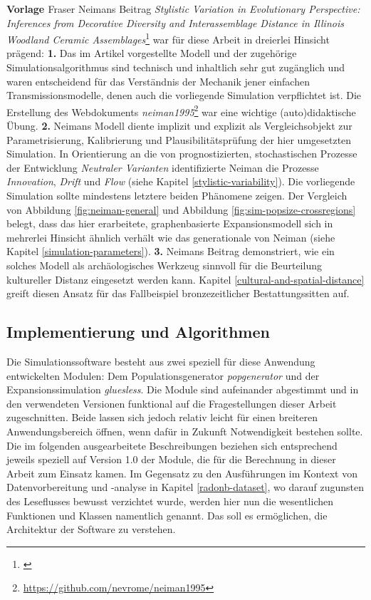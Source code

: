 \documentclass[openany,twoside,twocolumn]{book}
\let\rmarkdownfootnote\footnote%
\def\footnote{\protect\rmarkdownfootnote}
\begin{document}
\textbf{Vorlage \textcite{neiman_stylistic_1995}} \newline  Fraser
Neimans Beitrag \emph{Stylistic Variation in Evolutionary Perspective:
Inferences from Decorative Diversity and Interassemblage Distance in
Illinois Woodland Ceramic Assemblages}\footnote{\textcite{neiman_stylistic_1995}}
war für diese Arbeit in dreierlei Hinsicht prägend: \textbf{1.} Das im
Artikel vorgestellte Modell und der zugehörige Simulationsalgorithmus
sind technisch und inhaltlich sehr gut zugänglich und waren entscheidend
für das Verständnis der Mechanik jener einfachen Transmissionsmodelle,
denen auch die vorliegende Simulation verpflichtet ist. Die Erstellung
des Webdokuments \emph{neiman1995}\footnote{\url{https://github.com/nevrome/neiman1995}}
war eine wichtige (auto)didaktische Übung. \textbf{2.} Neimans Modell
diente implizit und explizit als Vergleichsobjekt zur Parametrisierung,
Kalibrierung und Plausibilitätsprüfung der hier umgesetzten Simulation.
In Orientierung an die von \textcite{dunnell1978style} prognostizierten,
stochastischen Prozesse der Entwicklung \emph{Neutraler Varianten}
identifizierte Neiman die Prozesse \emph{Innovation}, \emph{Drift} und
\emph{Flow} (siehe Kapitel \ref{stylistic-variability}). Die vorliegende
Simulation sollte mindestens letztere beiden Phänomene zeigen. Der
Vergleich von Abbildung \ref{fig:neiman-general} und Abbildung
\ref{fig:sim-popsize-crossregions} belegt, dass das hier erarbeitete,
graphenbasierte Expansionsmodell sich in mehrerlei Hinsicht ähnlich
verhält wie das generationale von Neiman (siehe Kapitel
\ref{simulation-parameters}). \textbf{3.} Neimans Beitrag demonstriert,
wie ein solches Modell als archäologisches Werkzeug sinnvoll für die
Beurteilung kultureller Distanz eingesetzt werden kann. Kapitel
\ref{cultural-and-spatial-distance} greift diesen Ansatz für das
Fallbeispiel bronzezeitlicher Bestattungssitten auf.

\hypertarget{implementierung-und-algorithmen}{%
\subsection{Implementierung und
Algorithmen}\label{implementierung-und-algorithmen}}

Die Simulationssoftware besteht aus zwei speziell für diese Anwendung
entwickelten Modulen: Dem Populationsgenerator \emph{popgenerator} und
der Expansionssimulation \emph{gluesless}. Die Module sind aufeinander
abgestimmt und in den verwendeten Versionen funktional auf die
Fragestellungen dieser Arbeit zugeschnitten. Beide lassen sich jedoch
relativ leicht für einen breiteren Anwendungsbereich öffnen, wenn dafür
in Zukunft Notwendigkeit bestehen sollte. Die im folgenden
ausgearbeitete Beschreibungen beziehen sich entsprechend jeweils
speziell auf Version 1.0 der Module, die für die Berechnung in dieser
Arbeit zum Einsatz kamen. Im Gegensatz zu den Ausführungen im Kontext
von Datenvorbereitung und -analyse in Kapitel \ref{radonb-dataset}, wo
darauf zugunsten des Leseflusses bewusst verzichtet wurde, werden hier
nun die wesentlichen Funktionen und Klassen namentlich genannt. Das soll
es ermöglichen, die Architektur der Software zu verstehen.
\end{document}
